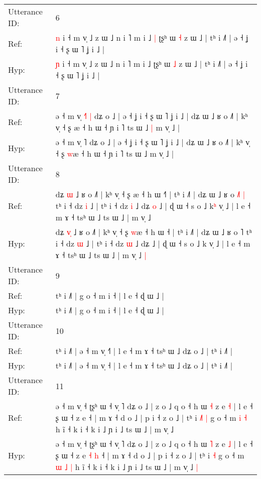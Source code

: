 \documentclass[10pt]{article}
\DeclareRobustCommand{\hl}[1]{{\textcolor{red}{#1}}}
\begin{document}
\begin{longtable}{ll}
 \\
\midrule
Utterance ID: & 6 \\
Ref: & \hl{n} i ˧ m v̩ ˩ z ɯ ˩ n i ˥ m i ˩\hl{ }\hl{|} ʈʂʰ ɯ \hl{˧} z ɯ ˩ | tʰ i ˩˥ | ə ˧ ʝ i ˧ ʂ ɯ ˥ ʝ i ˩ |
 \\
Hyp: & \hl{ɲ} i ˧ m v̩ ˩ z ɯ ˩ n i ˥ m i ˩\hl{}\hl{} ʈʂʰ ɯ \hl{˩} z ɯ ˩ | tʰ i ˩˥ | ə ˧ ʝ i ˧ ʂ ɯ ˥ ʝ i ˩ |
 \\
\midrule
Utterance ID: & 7 \\
Ref: & ə ˧ m v̩ \hl{˧}˥\hl{ }\hl{|} dʑ o ˩ | ə ˧ ʝ i ˧ ʂ ɯ ˥ ʝ i ˩ | dʑ ɯ ˩ ʁ o ˩˥ | kʰ v̩ ˧ ʂ \hl{}æ ˧ h ɯ ˧ ɲ i ˥ ts ɯ ˩\hl{ }\hl{|} m v̩ ˩ |
 \\
Hyp: & ə ˧ m v̩ \hl{}˥\hl{}\hl{} dʑ o ˩ | ə ˧ ʝ i ˧ ʂ ɯ ˥ ʝ i ˩ | dʑ ɯ ˩ ʁ o ˩˥ | kʰ v̩ ˧ ʂ \hl{w}æ ˧ h ɯ ˧ ɲ i ˥ ts ɯ ˩\hl{}\hl{} m v̩ ˩ |
 \\
\midrule
Utterance ID: & 8 \\
Ref: & dʑ \hl{}\hl{ɯ} ˩ ʁ o ˩˥ | kʰ v̩ ˧ ʂ \hl{}æ ˧ h ɯ ˧\hl{˥} | tʰ i ˩˥ | dʑ ɯ ˩ ʁ o \hl{˩}˥\hl{ }\hl{|} tʰ i ˧ dz \hl{i} ˩ | tʰ i ˧ dz \hl{i} ˩ dʑ\hl{ }\hl{o} ˩ | ɖ ɯ ˧ s o ˩ k\hl{ʰ} v̩ ˩ | l e ˧ m ɤ ˧ tsʰ ɯ ˩ ts ɯ ˩ | m v̩ ˩\hl{}\hl{}
 \\
Hyp: & dʑ \hl{v}\hl{̩} ˩ ʁ o ˩˥ | kʰ v̩ ˧ ʂ \hl{w}æ ˧ h ɯ ˧\hl{} | tʰ i ˩˥ | dʑ ɯ ˩ ʁ o \hl{}˥\hl{}\hl{} tʰ i ˧ dz \hl{ɯ} ˩ | tʰ i ˧ dz \hl{ɯ} ˩ dʑ\hl{}\hl{} ˩ | ɖ ɯ ˧ s o ˩ k\hl{} v̩ ˩ | l e ˧ m ɤ ˧ tsʰ ɯ ˩ ts ɯ ˩ | m v̩ ˩\hl{ }\hl{|}
 \\
\midrule
Utterance ID: & 9 \\
Ref: & tʰ i ˩˥ | g o ˧ m i ˧ | l e ˧ ɖ ɯ ˩ |
 \\
Hyp: & tʰ i ˩˥ | g o ˧ m i ˧ | l e ˧ ɖ ɯ ˩ |
 \\
\midrule
Utterance ID: & 10 \\
Ref: & tʰ i ˩˥ | ə ˧ m v̩ ˧\hl{˥} | l e ˧ m ɤ ˧ tsʰ ɯ ˩ dʑ o ˩ | tʰ i ˩˥ |
 \\
Hyp: & tʰ i ˩˥ | ə ˧ m v̩ ˧\hl{} | l e ˧ m ɤ ˧ tsʰ ɯ ˩ dʑ o ˩ | tʰ i ˩˥ |
 \\
\midrule
Utterance ID: & 11 \\
Ref: & ə ˧ m v̩ ˧ ʈʂʰ ɯ ˧ v̩ ˥ dʑ o ˩ | z o ˩ q o ˧ h ɯ \hl{˧} z e \hl{˧} | l e ˧ ʂ ɯ ˧ z e\hl{}\hl{}\hl{}\hl{} ˧ | m ɤ ˧ d o ˩ | p i ˧ z o ˩ | tʰ i\hl{ }\hl{˩}\hl{˥} \hl{|} g o ˧ m\hl{}\hl{} \hl{i} \hl{˧} h ĩ ˧ k i ˧ k i ˩ ɲ i ˩ ts ɯ ˩ | m v̩ ˩\hl{}\hl{}
 \\
Hyp: & ə ˧ m v̩ ˧ ʈʂʰ ɯ ˧ v̩ ˥ dʑ o ˩ | z o ˩ q o ˧ h ɯ \hl{˥} z e \hl{˩} | l e ˧ ʂ ɯ ˧ z e\hl{ }\hl{˧}\hl{ }\hl{h} ˧ | m ɤ ˧ d o ˩ | p i ˧ z o ˩ | tʰ i\hl{}\hl{}\hl{} \hl{˧} g o ˧ m\hl{ }\hl{ɯ} \hl{˩} \hl{|} h ĩ ˧ k i ˧ k i ˩ ɲ i ˩ ts ɯ ˩ | m v̩ ˩\hl{ }\hl{|}

\end{longtable}
\end{document}
